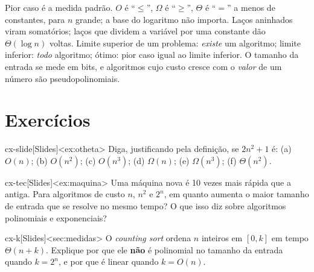 \begin{chave}
Pior caso é a medida padrão. $O$ é ``$\le$'', $\Omega$ é ``$\ge$'', $\Theta$ é ``$=$'' a menos de constantes, para $n$ grande; a base do logaritmo não importa. Laços aninhados viram somatórios; laços que dividem a variável por uma constante dão $\Theta(\log n)$ voltas. Limite superior de um problema: \emph{existe} um algoritmo; limite inferior: \emph{todo} algoritmo; ótimo: pior caso igual ao limite inferior. O tamanho da entrada se mede em bits, e algoritmos cujo custo cresce com o \emph{valor} de um número são pseudopolinomiais.
\end{chave}

\section{Exercícios}
\excurso
\begin{exercicio}{cx-slide}[Slides]<ex:otheta>
Diga, justificando pela definição, se $2n^2+1$ é: (a) $O(n)$; (b) $O(n^2)$; (c) $O(n^3)$; (d) $\Omega(n)$; (e) $\Omega(n^3)$; (f) $\Theta(n^2)$.
\end{exercicio}
\begin{exercicio}{cx-tec}[Slides]<ex:maquina>
Uma máquina nova é 10 vezes mais rápida que a antiga. Para algoritmos de custo $n$, $n^2$ e $2^n$, em quanto aumenta o maior tamanho de entrada que se resolve no mesmo tempo? O que isso diz sobre algoritmos polinomiais e exponenciais?
\end{exercicio}
\begin{exercicio}{cx-k}[Slides]<sec:medidas>
O \emph{counting sort} ordena $n$ inteiros em $[0,k]$ em tempo $\Theta(n+k)$. Explique por que ele \textbf{não} é polinomial no tamanho da entrada quando $k=2^n$, e por que é linear quando $k=O(n)$.
\end{exercicio}

